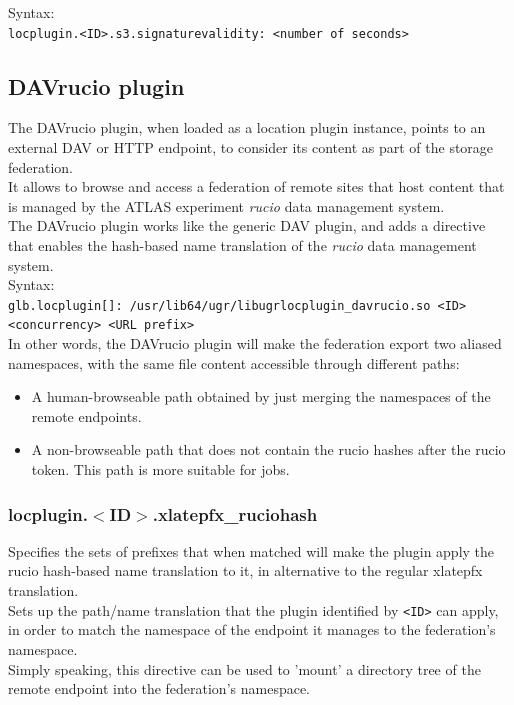 \documentclass[12pt]{article} %
\begin{document}
Syntax:\\
\lstinline"locplugin.<ID>.s3.signaturevalidity: <number of seconds>"\\





\subsection{DAVrucio plugin}
The DAVrucio plugin, when loaded as a location plugin instance, points to an external DAV or HTTP endpoint, to consider its content as part of the storage federation.\\
It allows to browse and access a federation of remote sites that host content that is managed by the ATLAS experiment \textit{rucio} data management system.\\
The DAVrucio plugin works like the generic DAV plugin, and adds a directive that enables the hash-based name translation of the \textit{rucio} data management system.\\

Syntax:\\
\lstinline"glb.locplugin[]: /usr/lib64/ugr/libugrlocplugin_davrucio.so <ID> <concurrency> <URL prefix>"\\

In other words, the DAVrucio plugin will make the federation export two aliased namespaces, with the same file content accessible through different paths:
\begin{itemize}
 \item A human-browseable path obtained by just merging the namespaces of the remote endpoints.
 \item A non-browseable path that does not contain the rucio hashes after the rucio token. This path is more suitable for jobs.
\end{itemize}


\subsubsection{locplugin.$<$ID$>$.xlatepfx\_ruciohash}

Specifies the sets of prefixes that when matched will make the plugin apply the rucio hash-based name translation to it, in alternative to the regular xlatepfx translation.\\
Sets up the path/name translation that the plugin identified by \lstinline"<ID>" can apply, in order to match the namespace of the endpoint it manages to the federation's namespace.\\
Simply speaking, this directive can be used to 'mount' a directory tree of the remote endpoint into the federation's namespace.\\
\end{document}
